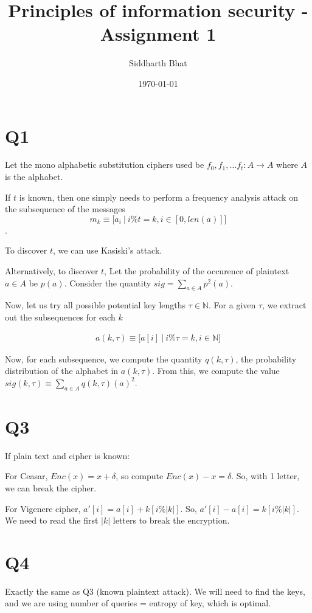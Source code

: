 \documentclass[11pt]{article}
\author{Siddharth Bhat}
\title{Principles of information security - Assignment 1}
\date{\today}
\newcommand{\N}{\mathbb{N}}
\begin{document}
\maketitle

\section{Q1}
Let the mono alphabetic substitution ciphers used be $f_0, f_1, \dots f_t : A \rightarrow A$
where $A$ is the alphabet.

If $t$ is known, then one simply needs to perform a frequency analysis attack
on the subsequence of the messages \[m_k \equiv \big[ a_i ~|~ i \% t = k, i \in [0, len(a)]\big]\].


To discover $t$, we can use Kasiski's attack.

Alternatively, to discover $t$, Let the probability of the occurence of plaintext
$a \in A$ be $p(a)$. Consider the quantity $sig = \sum_{a \in A} p^2(a)$.

Now, let us try all possible potential key lengths $\tau \in \N$. For a
given $\tau$, we extract out the subsequences for each $k$

\begin{align*}
    a(k, \tau) \equiv \big[ a[i] ~|~ i \% \tau = k, i \in \N \big]
\end{align*}

Now, for each subsequence, we compute the quantity  $q(k, \tau)$, the
probability distribution of the alphabet in $a(k, \tau)$. From this,
we compute the value $sig(k, \tau) \equiv \sum_{a \in A} q(k, \tau)(a)^2$.

\section{Q3}
If plain text and cipher is known:

For Ceasar, $Enc(x) = x + \delta$, so
compute $Enc(x) - x = \delta$. So, with 1 letter, we can break the cipher.

For Vigenere cipher, $a'[i] = a[i] + k[i \% |k|]$. So, $a'[i] - a[i] = k[i \%
|k|]$. We need to read the first $|k|$ letters to break the encryption.

\section{Q4}
Exactly the same as Q3 (known plaintext attack). We will need to find the
keys, and we are using number of queries = entropy of key, which is optimal.
\end{document}
